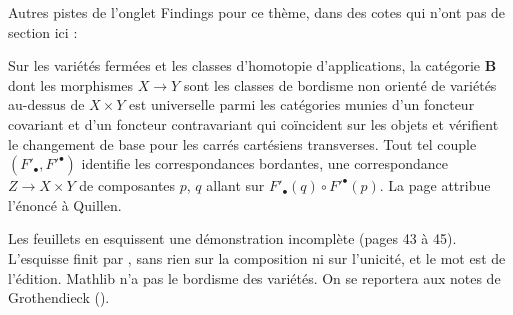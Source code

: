 \bigskip
\noindent Autres pistes de l'onglet Findings pour ce thème, dans des cotes qui n'ont pas de section ici :\par

\begin{encadre}
\begin{theoreme*}\nonverifie
Sur les variétés fermées et les classes d'homotopie d'applications, la catégorie $\mathbf B$ dont les morphismes $X \to Y$ sont les classes de bordisme non orienté de variétés au-dessus de $X \times Y$ est universelle parmi les catégories munies d'un foncteur covariant et d'un foncteur contravariant qui coïncident sur les objets et vérifient le changement de base pour les carrés cartésiens transverses. Tout tel couple $(F'_\bullet, F'^\bullet)$ identifie les correspondances bordantes, une correspondance $Z \to X \times Y$ de composantes $p$, $q$ allant sur $F'_\bullet(q) \circ F'^\bullet(p)$. La page attribue l'énoncé à Quillen.
\end{theoreme*}
\end{encadre}
{\small Les feuillets en esquissent une démonstration incomplète (pages 43 à 45). L'esquisse finit par , sans rien sur la composition ni sur l'unicité, et le mot  est de l'édition. Mathlib n'a pas le bordisme des variétés. On se reportera aux notes de Grothendieck ().\par}

